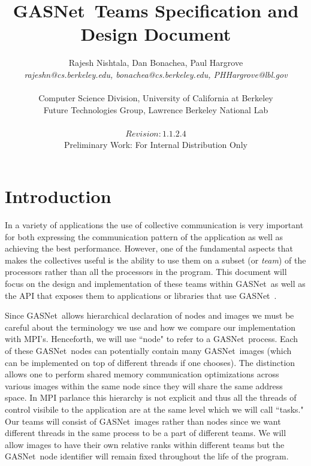 \documentclass[times,10pt]{article}
\begin{document}
\newcommand{\gasnet}[0]{GASNet\ }





\title{\gasnet Teams Specification and Design Document}
\author{Rajesh Nishtala, Dan Bonachea, Paul Hargrove\\
    \emph{rajeshn@cs.berkeley.edu, bonachea@cs.berkeley.edu, PHHargrove@lbl.gov} \\\\
    Computer Science Division, University of California at Berkeley \\ 
    Future Technologies Group, Lawrence Berkeley National Lab\\ \\
    $Revision: 1.1.2.4 $ \\
    Preliminary Work: For Internal Distribution Only}
\maketitle


\section{Introduction}
In a variety of applications the use of collective communication is very
important for both expressing the communication pattern of the application as
well as achieving the best performance. However, one of the fundamental aspects
that makes the collectives useful is the ability to use them on a subset (or
\textit{team}) of the processors rather than all the processors in the program.
This document will focus on the design and implementation of these teams within
\gasnet as well as the API that exposes them to applications or libraries that
use \gasnet. 

Since \gasnet allows hierarchical declaration of nodes and images we must be
careful about the terminology we use and how we compare our implementation with
MPI's. Henceforth, we will use ``node" to refer to a \gasnet process. Each of
these \gasnet nodes can potentially contain many  \gasnet images (which can be
implemented on top of different threads if one chooses). The distinction allows
one to perform shared memory communication optimizations across various images
within the same node since they will share the same address space. In MPI
parlance this hierarchy is not explicit and thus all the threads of control
visibile to the application are at the same level which we will call ``tasks."
Our teams will consist of \gasnet images rather than nodes since we want
different threads in the same process to be a part of different teams. We will
allow images to have their own relative ranks within different teams but the
\gasnet node identifier will remain fixed throughout the life of the program. 
\end{document}
